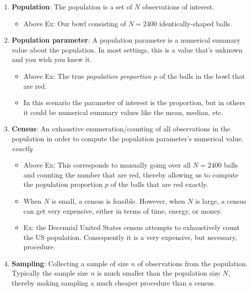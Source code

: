 \documentclass[12pt,]{krantz}
\providecommand{\tightlist}{%
  \setlength{\itemsep}{0pt}\setlength{\parskip}{0pt}}
\theoremstyle{definition}
\theoremstyle{definition}
\theoremstyle{definition}
\theoremstyle{remark}
\begin{document}
\begin{enumerate}
\def\labelenumi{\arabic{enumi}.}
\tightlist
\item
  \textbf{Population}: The population is a set of \(N\) observations of
  interest.

  \begin{itemize}
  \tightlist
  \item
    Above Ex: Our bowl consisting of \(N=2400\) identically-shaped
    balls.
  \end{itemize}
\item
  \textbf{Population parameter}: A population parameter is a numerical
  summary value about the population. In most settings, this is a value
  that's unknown and you wish you knew it.

  \begin{itemize}
  \tightlist
  \item
    Above Ex: The true \emph{population proportion \(p\)} of the balls
    in the bowl that are red.
  \item
    In this scenario the parameter of interest is the proportion, but in
    others it could be numerical summary values like the mean, median,
    etc.
  \end{itemize}
\item
  \textbf{Census}: An exhaustive enumeration/counting of all
  observations in the population in order to compute the population
  parameter's numerical value. \emph{exactly}

  \begin{itemize}
  \tightlist
  \item
    Above Ex: This corresponds to manually going over all \(N=2400\)
    balls and counting the number that are red, thereby allowing us to
    compute the population proportion \(p\) of the balls that are red
    exactly.
  \item
    When \(N\) is small, a census is feasible. However, when \(N\) is
    large, a census can get very expensive, either in terms of time,
    energy, or money.
  \item
    Ex: the Decennial United States census attempts to exhaustively
    count the US population. Consequently it is a very expensive, but
    necessary, procedure.
  \end{itemize}
\item
  \textbf{Sampling}: Collecting a sample of size \(n\) of observations
  from the population. Typically the sample size \(n\) is much smaller
  than the population size \(N\), thereby making sampling a much cheaper
  procedure than a census.


\end{enumerate}
\end{document}
